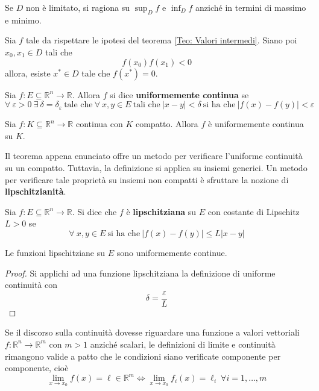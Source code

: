     \begin{oss}
        Se $D$ non è limitato, si ragiona su $\sup_{D}{f}$ e $\inf_{D}{f}$ anziché in termini di massimo e minimo.
    \end{oss}
\begin{corollary} \label{Teo: Teorema degli zeri}
    Sia $f$ tale da rispettare le ipotesi del teorema \ref{Teo: Valori intermedi}. Siano poi $x_0, x_1 \in D$ tali che 
    \begin{equation*}
        f(x_0)f(x_1) < 0
    \end{equation*}
    allora, esiste $x^* \in D$ tale che $f(x^*)=0$.
\end{corollary}
\begin{definition} \label{Def: Uniforme continuità}
    Sia $f:E \subseteq \mathbb{R}^n \to \mathbb{R}$. Allora $f$ si dice \textbf{uniformemente continua} se
    \begin{equation*}
        \forall\ \varepsilon >0 \ \exists\ \delta=\delta_\varepsilon\ \text{tale che}\ \forall\ x, y \in E\ \text{tali che}\ |x-y|<\delta\ \text{si ha che}\ |f(x)-f(y)| < \varepsilon
    \end{equation*}
\end{definition}
\begin{theorem} \label{Teo: Heine Cantor}
    Sia $f: K \subseteq \mathbb{R}^n \to \mathbb{R}$ continua con $K$ compatto. Allora $f$ è uniformemente continua su $K$.
\end{theorem}
Il teorema appena enunciato offre un metodo per verificare l'uniforme continuità su un compatto. Tuttavia, la definizione si applica su insiemi generici. Un metodo per verificare tale proprietà su insiemi non compatti è sfruttare la nozione di \textbf{lipschitzianità}.
\begin{definition} \label{Def: Funzione lipschitziana}
    Sia $f:E \subseteq \mathbb{R}^n \to \mathbb{R}$. Si dice che $f$ è \textbf{lipschitziana} su $E$ con costante di Lipschitz $L>0$ se
    \begin{equation*}
        \forall\ x,y \in E\ \text{si ha che}\ |f(x)-f(y)| \leq L|x-y|
    \end{equation*}
\end{definition}
\begin{proposition}
    Le funzioni lipschitziane su $E$ sono uniformemente continue.
\end{proposition}
    \begin{proof}
        Si applichi ad una funzione lipschitziana la definizione di uniforme continuità con 
        \begin{equation*}
            \delta= \frac{\varepsilon}{L}
        \end{equation*}
    \end{proof}
Se il discorso sulla continuità dovesse riguardare una funzione a valori vettoriali $f: \mathbb{R}^n \to \mathbb{R}^m$ con $m>1$ anziché scalari, le definizioni di limite e continuità rimangono valide a patto che le condizioni siano verificate componente per componente, cioè
\begin{equation*}
    \lim_{x \to x_0}{f(x)}=\ell \in \mathbb{R}^m \iff \lim_{x \to x_0}{f_i(x)}=\ell_i\ \forall i=1, \dots, m
\end{equation*}
